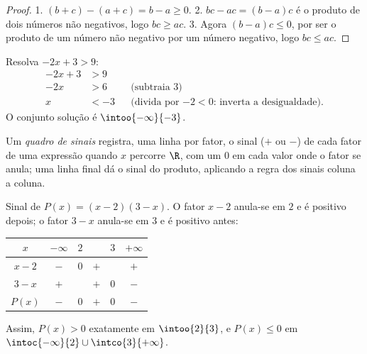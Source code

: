 \begin{proof}
1. $(b + c) - (a + c) = b - a \geq 0$.
2. $bc - ac = (b-a)c$ é o produto de dois números não negativos, logo
$bc \geq ac$.
3. Agora $(b-a)c \leq 0$, por ser o produto de um número não negativo por
um número negativo, logo $bc \leq ac$.
\end{proof}

\begin{example}\label{ex:g10:algebra:firstineq}
Resolva $-2x + 3 > 9$:
\begin{align*}
-2x + 3 &> 9 \\
-2x &> 6 && \text{(subtraia 3)} \\
x &< -3 && \text{(divida por $-2 < 0$: inverta a desigualdade).}
\end{align*}
O conjunto solução é $\intoo{-\infty}{-3}$.
\end{example}

\begin{definition}\label{def:g10:algebra:signtable}
Um \emph{quadro de sinais} registra, uma linha por
fator, o sinal ($+$ ou $-$) de cada fator de uma expressão quando $x$
percorre $\R$, com um $0$ em cada valor onde o fator se anula; uma linha
final dá o sinal do produto, aplicando a regra dos sinais coluna a coluna.
\end{definition}

\begin{example}\label{ex:g10:algebra:signtable}
Sinal de $P(x) = (x - 2)(3 - x)$. O fator $x - 2$ anula-se em $2$ e é
positivo depois; o fator $3 - x$ anula-se em $3$ e é positivo antes:
\begin{center}
\renewcommand{\arraystretch}{1.3}
\begin{tabular}{c|ccccc}
$x$ & $-\infty$ \quad & $2$ & & $3$ & \quad $+\infty$ \\
\hline
$x - 2$ & $-$ & $0$ & $+$ & & $+$ \\
$3 - x$ & $+$ & & $+$ & $0$ & $-$ \\
\hline
$P(x)$ & $-$ & $0$ & $+$ & $0$ & $-$ \\
\end{tabular}
\end{center}
Assim, $P(x) > 0$ exatamente em $\intoo{2}{3}$, e $P(x) \leq 0$ em
$\intoc{-\infty}{2} \cup \intco{3}{+\infty}$.
\end{example}

